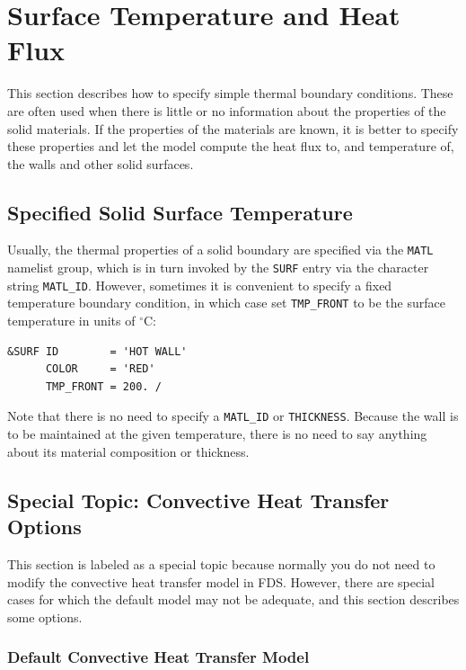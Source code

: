 \documentclass[11pt]{book}
\newcommand{\ct}{\tt\small}
\begin{document}
\clearpage

\section{Surface Temperature and Heat Flux}

This section describes how to specify simple thermal boundary conditions. These are often used when there is little or no
information about the properties of the solid materials. If the properties of the materials are known, it is better to specify these
properties and let the model compute the heat flux to, and temperature of, the walls and other solid surfaces.


\subsection{Specified Solid Surface Temperature}
\label{info:specified_temperature}

Usually, the thermal properties of a solid boundary are specified via the
{\ct MATL} namelist group, which is in turn invoked by the {\ct SURF} entry via
the character string {\ct MATL\_ID}. However, sometimes it is convenient to
specify a fixed temperature boundary condition, in which case set
{\ct TMP\_FRONT} to be the surface temperature in units of $^\circ$C:

\footnotesize
\begin{verbatim}
&SURF ID        = 'HOT WALL'
      COLOR     = 'RED'
      TMP_FRONT = 200. /
\end{verbatim}
\normalsize

\noindent
Note that there is no need to specify a {\ct MATL\_ID} or {\ct THICKNESS}. Because the wall is to be maintained at the given temperature,
there is no need to say anything about its material composition or thickness.



\subsection{Special Topic: Convective Heat Transfer Options}
\label{info:convection}

This section is labeled as a special topic because normally you do not need to modify the convective heat transfer
model in FDS. However, there are special cases for which the default model may not be adequate, and this section
describes some options.

\subsubsection{Default Convective Heat Transfer Model}
\end{document}
